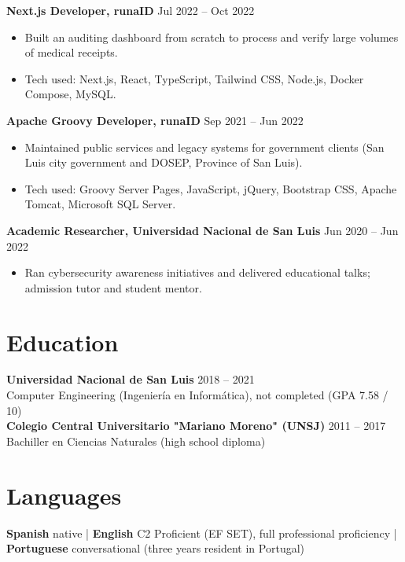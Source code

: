 \documentclass[10pt, a4paper]{article}
\begin{document}
\textbf{Next.js Developer, runaID} \hfill Jul 2022 -- Oct 2022
\begin{itemize}[leftmargin=10pt, noitemsep]
    \item Built an auditing dashboard from scratch to process and verify large volumes of medical receipts.
    \item Tech used: Next.js, React, TypeScript, Tailwind CSS, Node.js, Docker Compose, MySQL.
\end{itemize}

\textbf{Apache Groovy Developer, runaID} \hfill Sep 2021 -- Jun 2022
\begin{itemize}[leftmargin=10pt, noitemsep]
    \item Maintained public services and legacy systems for government clients (San Luis city government and DOSEP, Province of San Luis).
    \item Tech used: Groovy Server Pages, JavaScript, jQuery, Bootstrap CSS, Apache Tomcat, Microsoft SQL Server.
\end{itemize}

\textbf{Academic Researcher, Universidad Nacional de San Luis} \hfill Jun 2020 -- Jun 2022
\begin{itemize}[leftmargin=10pt, noitemsep]
    \item Ran cybersecurity awareness initiatives and delivered educational talks; admission tutor and student mentor.
\end{itemize}

\section{Education}
\textbf{Universidad Nacional de San Luis} \hfill 2018 -- 2021 \\
Computer Engineering (Ingeniería en Informática), not completed (GPA 7.58 / 10) \\[2pt]
\textbf{Colegio Central Universitario "Mariano Moreno" (UNSJ)} \hfill 2011 -- 2017 \\
Bachiller en Ciencias Naturales (high school diploma)

\section{Languages}
\textbf{Spanish} native | \textbf{English} C2 Proficient (EF SET), full professional proficiency | \textbf{Portuguese} conversational (three years resident in Portugal)

\end{document}

